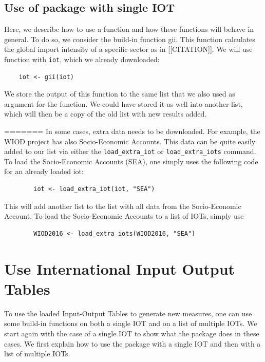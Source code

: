 \documentclass[10pt,a4paper]{paper}
\begin{document}
\begin{itemize}
	\subsection{Use of package with single IOT}
	Here, we describe how to use a function and how these functions will behave in general. To do so, we consider the build-in function gii. This function  calculates the global import intensity of a specific sector as in [[CITATION]]. We will use function with \texttt{iot}, which we already downloaded:
	\begin{Verbatim}
	iot <- gii(iot)
	\end{Verbatim}
	We store the output of this function to the same list that we also used as argument for the function. We could have stored it as well into another list, which will then be a copy of the old list with new results added.
	
=======
	In some cases, extra data needs to be downloaded. For example, the WIOD project has also Socio-Economic Accounts. This data can be quite easily added to our list via either the \texttt{load\_extra\_iot} or \texttt{load\_extra\_iots} command. To load the Socio-Economic Accounts (SEA), one simply uses the following code for an already loaded iot:
	\begin{verbatim}
		iot <- load_extra_iot(iot, "SEA")
	\end{verbatim}
	This will add another list to the list with all data from the Socio-Economic Account. 
	To load the Socio-Economic Accounts to a list of IOTs, simply use
	\begin{verbatim}
		WIOD2016 <- load_extra_iots(WIOD2016, "SEA")
	\end{verbatim}
	
	
	\section{Use International Input Output Tables}
	To use the loaded Input-Output Tables to generate new measures, one can use some build-in functions on both a single IOT and on a list of multiple IOTs. We start again with the case of a single IOT to show what the package does in these cases. We first explain how to use the package with a single IOT and then with a list of multiple IOTs.
	

\end{itemize}
\end{document}
